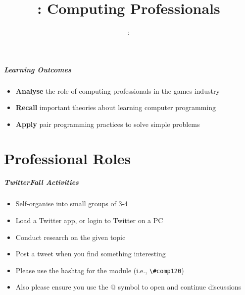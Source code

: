 \usepackage{../../beamerthemeFalmouthGamesAcademy}
\usepackage{multimedia}
\graphicspath{ {../../} }

\usepackage{textcomp}


\usepackage[normalem]{ulem}
\usepackage{wasysym}

\usepackage{pdfpages}

\usetikzlibrary{arrows,automata}







\title{\sessionnumber: Computing Professionals}
\subtitle{\modulecode: \moduletitle}

\frame{\titlepage} 

\begin{frame}
	\frametitle{Learning Outcomes}
	\begin{itemize}
		\item \textbf{Analyse} the role of computing professionals in the games industry
		\item \textbf{Recall} important theories about learning computer programming
		\item \textbf{Apply} pair programming practices to solve simple problems
	\end{itemize}
\end{frame}

\part{Professional Roles}
\frame{\partpage}

\begin{frame}
	\frametitle{TwitterFall Activities}
		
	\begin{itemize}
		\item Self-organise into small groups of 3-4
		\item Load a Twitter app, or login to Twitter on a PC
		\item Conduct research on the given topic
		\item Post a tweet when you find something interesting
	\end{itemize}

	\begin{itemize}
		\item Please use the hashtag for the module (i.e., \lstinline{\#comp120})
		\item Also please ensure you use the @ symbol to open and continue discussions
	\end{itemize}
\end{frame}


